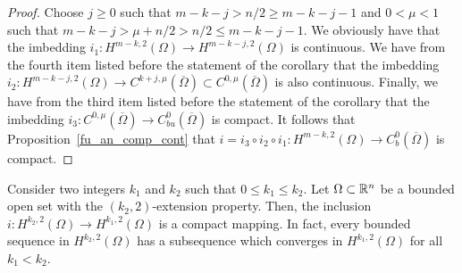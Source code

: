 \begin{proof}
 Choose $j \geq 0$ such that $m-k -j >n/2 \geq m-k-j-1$ and
$0<\mu<1$ such that $m-k -j > \mu + n/2 > n/2 \leq m-k-j-1$.
We obviously have that the imbedding
$\displaystyle i_1 : H^{m-k,2}(\Omega) \to H^{m-k-j,2}(\Omega)$
is continuous.  We have from the fourth item listed before the
statement of the corollary that the imbedding
$\displaystyle i_2 : H^{m-k-j,2}(\Omega) \to
C^{k+j,\mu}(\overline{\Omega}) \subset C^{0,\mu}(\overline{\Omega})$
is also continuous.  Finally, we have from the third item 
listed before the statement of the corollary that the imbedding
$\displaystyle i_3 : C^{0,\mu}(\overline{\Omega})
\to C_{bu}^0(\overline{\Omega})$ is
compact.  It follows that Proposition~\ref{fu_an_comp_cont} that
$\displaystyle i = i_3 \circ i_2 \circ i_1:
H^{m-k,2}(\Omega) \to C^0_b(\overline{\Omega})$ is
compact.
\end{proof}

\begin{theorem} \label{sob_rell_th}
Consider two integers $k_1$ and $k_2$ such that $0\leq k_1\leq k_2$.
Let $\Omega \subset \mathbb{R}^n$ be a bounded open set with the
$(k_2,2)$-extension property.  Then, the inclusion
$\displaystyle i:H^{k_2,2}(\Omega) \to H^{k_1,2}(\Omega)$ is a
compact mapping.  In fact, every bounded sequence in
$\displaystyle H^{k_2,2}(\Omega)$ has a subsequence which converges in
$\displaystyle H^{k_1,2}(\Omega)$ for all $k_1 < k_2$.
\end{theorem}

